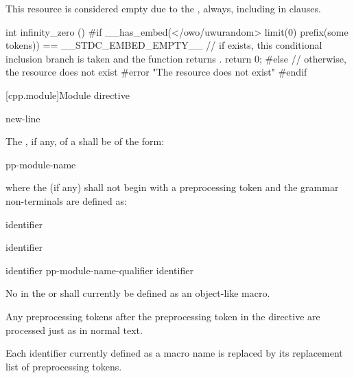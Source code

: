 \begin{example}
This resource is considered empty due to the  ,
always, including in  clauses.

\begin{codeblock}
int infinity_zero () {
#if __has_embed(</owo/uwurandom> limit(0) prefix(some tokens)) == __STDC_EMBED_EMPTY__
  // if  exists, this conditional inclusion branch is taken and the function returns .
  return 0;
#else
  // otherwise, the resource does not exist
#error "The resource does not exist"
#endif
}
\end{codeblock}
\end{example}

[cpp.module]{Module directive}
%

\begin{bnf}
\br
       \terminal{;} new-line
\end{bnf}

\pnum
The , if any, of a 
shall be of the form:
\begin{ncsimplebnf}
pp-module-name  
\end{ncsimplebnf}
where the  (if any) shall not begin with
a \tcode{(} preprocessing token and
the grammar non-terminals are defined as:
\begin{ncbnf}
\br
     identifier
\end{ncbnf}
\begin{ncbnf}
\br
    \terminal{:}  identifier
\end{ncbnf}
\begin{ncbnf}
\br
    identifier \br
    pp-module-name-qualifier identifier 
\end{ncbnf}
No  in
the  or 
shall currently be defined as an object-like macro.

\pnum
Any preprocessing tokens after the  preprocessing token
in the  directive are processed just as in normal text.
\begin{note}
Each identifier currently defined as a macro name
is replaced by its replacement list of preprocessing tokens.
\end{note}

